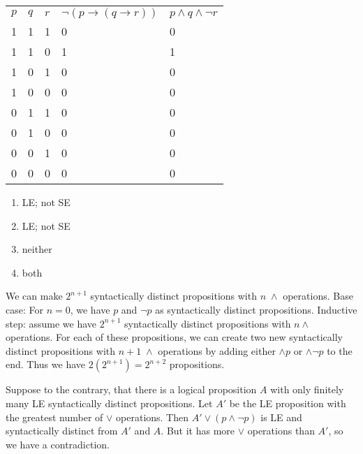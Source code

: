 \documentclass[solution, letterpaper]{cs20}
\begin{document}
\begin{solution}

\subsolution 

\begin{table}[h]
\centering
\label{my-label}
\begin{tabular}{lllll}
$p$ & $q$ & $r$& $\neg(p \to (q \to r))$ & $p \land q \land \neg r$ \\
1 & 1 & 1 & 0               & 0                      \\
1 & 1 & 0 & 1               & 1                      \\
1 & 0 & 1 & 0               & 0                      \\
1 & 0 & 0 & 0               & 0                      \\
0 & 1 & 1 & 0               & 0                      \\
0 & 1 & 0 & 0               & 0                      \\
0 & 0 & 1 & 0               & 0                      \\
0 & 0 & 0 & 0               & 0                     
\end{tabular}
\end{table}

\subsolution

\begin{enumerate}
\item LE; not SE
\item LE; not SE
\item neither
\item both
\end{enumerate}

\subsolution We can make $2^{n+1}$ syntactically distinct propositions with $n \; \land$ operations. Base case: For $n = 0$, we have $p$ and $\neg p$ as syntactically distinct propositions. Inductive step: assume we have $2^{n+1}$ syntactically distinct propositions with $n \land$ operations. For each of these propositions, we can create two new syntactically distinct propositions with $n+1 \; \land$ operations by adding either $\land p$ or $\land \neg p$ to the end. Thus we have $2(2^{n+1}) = 2^{n+2}$ propositions.

\subsolution Suppose to the contrary, that there is a logical proposition $A$ with only finitely many LE syntactically distinct propositions. Let $A'$ be the LE proposition with the greatest number of $\lor$ operations. Then $A' \lor (p \land \neg p)$ is LE and syntactically distinct from $A'$ and $A$. But it has more $\lor$ operations than $A'$, so we have a contradiction.

\end{solution}
\end{document}
